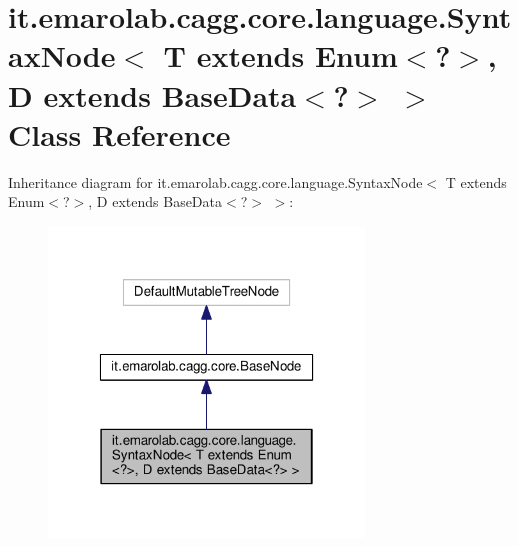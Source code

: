 \hypertarget{classit_1_1emarolab_1_1cagg_1_1core_1_1language_1_1SyntaxNode_3_01T_01extends_01Enum_3_04_4_00_0ad1119718731d7a79caa8c8c39688664}{\section{it.\-emarolab.\-cagg.\-core.\-language.\-Syntax\-Node$<$ T extends Enum$<$?$>$, D extends Base\-Data$<$?$>$ $>$ Class Reference}
\label{classit_1_1emarolab_1_1cagg_1_1core_1_1language_1_1SyntaxNode_3_01T_01extends_01Enum_3_04_4_00_0ad1119718731d7a79caa8c8c39688664}
}


Inheritance diagram for it.\-emarolab.\-cagg.\-core.\-language.\-Syntax\-Node$<$ T extends Enum$<$?$>$, D extends Base\-Data$<$?$>$ $>$\-:\nopagebreak
\begin{figure}[H]
\begin{center}
\leavevmode
\includegraphics[width=238pt]{classit_1_1emarolab_1_1cagg_1_1core_1_1language_1_1SyntaxNode_3_01T_01extends_01Enum_3_04_4_00_0472463ba93663f174fb88d320478c80f}
\end{center}
\end{figure}


